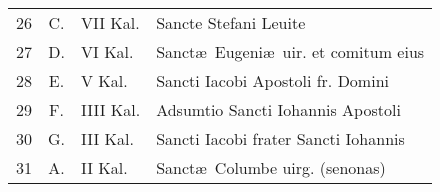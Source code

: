 \documentclass[a5paper,10pt]{book}
\begin{document}
\begin{center}
\begin{tabular}{r c l l}
26 & \color{Red} C. & VII Kal. & Sancte Stefani Leuite \\
27 & \color{Red} D. & VI Kal. & Sanct\ae \ Eugeni\ae \ uir. et comitum eius \\
28 & \color{Red} E. & V Kal. & Sancti Iacobi Apostoli fr. Domini \\
29 & \color{Red} F. & IIII Kal. & Adsumtio Sancti Iohannis Apostoli \\
30 & \color{Red} G. & III Kal. & Sancti Iacobi frater Sancti Iohannis \\
31 & \color{Red} A. & II Kal. & Sanct\ae \ Columbe uirg. (senonas) \\
\end{tabular}
\end{center}
\end{document}
